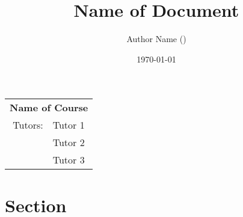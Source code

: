 \documentclass[a4paper, 12pt]{article}
\begin{document}
    \title{Name of Document}
    \author{Author Name ()}
    \date{\today}

    \makeatletter
        \let\headerauthor\@author
        \let\headertitle\@title
    \makeatother

    \begin{titlepage}
        \hypersetup{pageanchor=false} %
        \maketitle 
        \thispagestyle{fancy}
        \headheight 35pt
        \rhead{\small\today}
		
        \begin{table}[b]	
            \begin{center}
                \begin{tabular}{rl}
                    \multicolumn{2}{c}{\textbf{Name of Course}}\\
                    Tutors: & Tutor 1\\
                    & Tutor 2\\
                    & Tutor 3
                \end{tabular}
            \end{center}
        \end{table}
    \end{titlepage}
\clearpage
    \hypersetup{pageanchor=true} %
    \pagestyle{fancy}
    \headheight 36pt 
    \rhead{\small \headertitle\\\today}
    \lhead{\small \headerauthor}
    \cfoot{\thepage}
    \tableofcontents
\clearpage
    \section{Section}
        \label{sec:section}
\clearpage
\end{document}
